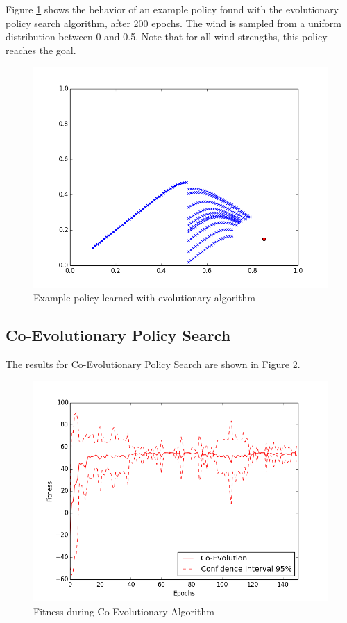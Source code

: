 Figure \ref{Example policy learned with evolutionary algorithm} shows the behavior of an example policy found with the evolutionary policy search algorithm, after 200 epochs. The wind is sampled from a uniform distribution between 0 and 0.5. Note that for all wind strengths, this policy reaches the goal. 

\begin{figure}[ht]
  \centering
  \includegraphics[scale=0.5]{images/evo_result.png}
  \caption{Example policy learned with evolutionary algorithm}\label{Example policy learned with evolutionary algorithm}
\end{figure}

\subsection{Co-Evolutionary Policy Search}

The results for Co-Evolutionary Policy Search are shown in Figure \ref{Fitness during Co-Evolutionary Algorithm}. 

\begin{figure}[ht]
  \centering
  \includegraphics[scale=0.5]{images/co_evo.png}
  \caption{Fitness during Co-Evolutionary Algorithm}\label{Fitness during Co-Evolutionary Algorithm}
\end{figure}

